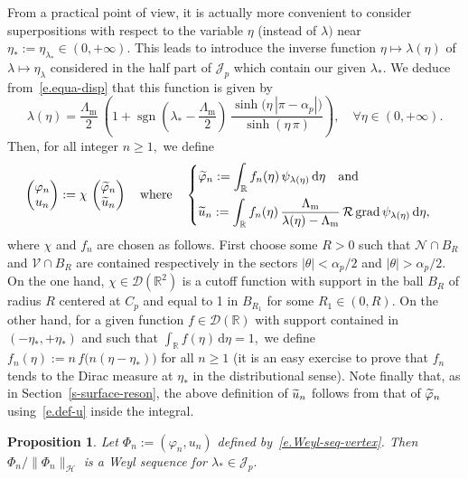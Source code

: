 \documentclass[11pt]{article}
\newtheorem{prop}[theo]{Proposition}
\theoremstyle{definition}
\numberwithin{equation}{section}
\numberwithin{figure}{section}
\numberwithin{table}{section}
\DeclareMathOperator{\sgn}{sgn}
\DeclareMathOperator{\grad}{grad}
\newcommand{\calD}{\mathcal{D}}
\newcommand{\calH}{\mathcal{H}}
\newcommand{\calJ}{\mathcal{J}}
\newcommand{\calN}{\mathcal{N}}
\newcommand{\calR}{\mathcal{R}}
\newcommand{\calV}{\mathcal{V}}
\newcommand{\bbR}{\mathbb{R}}
\newcommand{\rmd}{{\mathrm{d}}}
\newcommand{\Lm}{{\Lambda_{\mathrm{m}}}}
\let\oldtilde\tilde
\renewcommand*{\tilde}[1]{\mathchoice{\widetilde{#1}}{\widetilde{#1}}{\oldtilde{#1}}{\oldtilde{#1}}}
\let\oldforall\forall
\renewcommand*{\forall}{\mathrel{\oldforall}}
\begin{document}
From a practical point of view, it is actually more convenient to consider superpositions with respect to the variable $\eta$ (instead of $\lambda)$ near $\eta_* := \eta_{\lambda_*} \in (0,+\infty).$ This leads to introduce the inverse function $\eta \mapsto \lambda(\eta)$ of $\lambda \mapsto \eta_\lambda$ considered in the half part of $\calJ_p$ which contain our given $\lambda_*.$ We deduce from~\eqref{e.equa-disp} that this function is given by
\[
\lambda(\eta) = \frac{\Lm}{2}\ \left(1 + \sgn\left(\lambda_* - \frac{\Lm}{2}\right) \
\frac{\sinh\big(\eta\,|\pi-\alpha_p|\big)}{\sinh(\eta\,\pi)}
\right),
\quad\forall \eta \in (0,+\infty).
\]
Then, for all integer $n \geq 1,$ we define
\begin{equation}\label{e.Weyl-seq-vertex}
\begin{pmatrix} \varphi_n \\ u_n
\end{pmatrix}
:= \chi\,
\begin{pmatrix} \tilde \varphi_n \\ \tilde u_n
\end{pmatrix}
\quad\text{where}\quad
\begin{cases}
\displaystyle \tilde\varphi_n := \int_\bbR f_n(\eta)\, \psi_{\lambda(\eta)} \,\rmd\eta \quad\text{and} \\[10pt]
\displaystyle \tilde u_n := \int_\bbR f_n(\eta)\, \frac{\Lm}{\lambda(\eta)-\Lm}\,\calR \grad\psi_{\lambda(\eta)} \,\rmd\eta,
\end{cases}
\end{equation}
where $\chi$ and $f_n$ are chosen as follows. First choose some $R>0$ such that $\calN \cap B_R$ and $\calV \cap B_R$ are contained respectively in the sectors $|\theta| < \alpha_p/2$ and $|\theta| > \alpha_p/2$. On the one hand, $\chi \in \calD(\bbR^2)$ is a cutoff function with support in the ball $B_R$ of radius $R$ centered at $C_p$ and equal to 1 in $B_{R_1}$ for some $R_1 \in (0,R).$ On the other hand, for a given function $f \in \calD(\bbR)$ with support contained in $(-\eta_*,+\eta_*)$ and such that $\int_\bbR f(\eta) \,\rmd\eta = 1,$ we define $f_n(\eta) := n\,f\big(n(\eta-\eta_*)\big)$ for all $n \geq 1$ (it is an easy exercise to prove that $f_n$ tends to the Dirac measure at $\eta_*$ in the distributional sense). Note finally that, as in Section~\ref{s-surface-reson}, the above definition of $\tilde u_n$ follows from that of $\tilde\varphi_n$ using~\eqref{e.def-u} inside the integral.

\begin{prop}\label{p-Weyl-inner-corner}
Let $\Phi_n := (\varphi_n,u_n)$ defined by~\eqref{e.Weyl-seq-vertex}. Then $\Phi_n/\|\Phi_n\|_\calH$ is a Weyl sequence for $\lambda_* \in \calJ_p.$
\end{prop}
\end{document}
